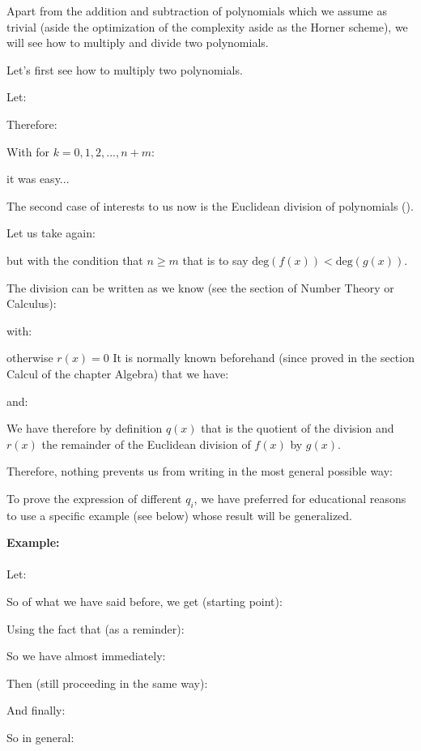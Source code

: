 	Apart from the addition and subtraction of polynomials which we assume as trivial (aside the optimization of the complexity aside as the Horner scheme), we will see how to multiply and divide two polynomials.
	
	Let's first see how to multiply two polynomials.
	
	Let:
	
	Therefore:
	
	With for $k=0,1,2,...,n+m$:
	
	it was easy...
	
	The second case of interests to us now is the Euclidean division of polynomials ().
	
	Let us take again:
	
	but with the condition that $n \geq m$ that is to say $\text{deg}(f(x))<\text{deg}(g(x))$.
	
	The division can be written as we know (see the section of Number Theory or Calculus):
	
	with:
	
	otherwise $r(x)=0$
	It is normally known beforehand (since proved in the section Calcul of the chapter Algebra) that we have:
	
	and:
	
	We have therefore by definition $q(x)$ that is the quotient of the division and $r(x)$ the remainder of the Euclidean division of $f(x)$ by $g (x)$.
	
	Therefore, nothing prevents us from writing in the most general possible way:
	
	To prove the expression of different $q_i$, we have preferred for educational reasons to use a specific example (see below) whose result will be generalized.
	
	\begin{tcolorbox}[colframe=black,colback=white,sharp corners]
\textbf{{\Large {}}Example:}\\\\
	Let:
	
	So of what we have said before, we get (starting point):
	
	Using the fact that (as a reminder):
	
	So we have almost immediately:
	
	Then (still proceeding in the same way):
	
	And finally:
	
	\end{tcolorbox}
	So in general:
	
